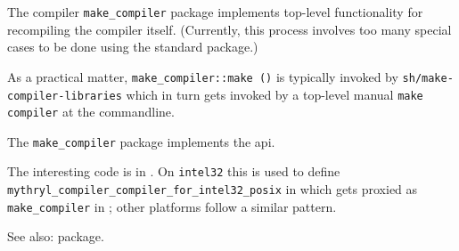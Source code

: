 
The compiler {\tt make\_compiler} package implements top-level functionality 
for recompiling the compiler itself.  (Currently, this process involves too many 
special cases to be done using the standard  package.)

As a practical matter, {\tt make\_compiler::make ()} is typically invoked by 
{\tt sh/make-compiler-libraries} which in turn gets invoked by a top-level 
manual {\tt make compiler} at the commandline.

The {\tt make\_compiler} package implements the  api.

The interesting code is in . 
On {\tt intel32} this is used to define {\tt mythryl\_compiler\_compiler\_for\_intel32\_posix} in  
which gets proxied as {\tt make\_compiler} in 
; other platforms follow a similar pattern.

See also:   package.


